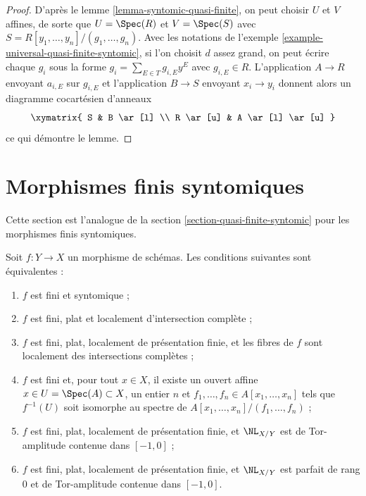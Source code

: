 \begin{proof}
D'après le lemme \ref{lemma-syntomic-quasi-finite},
on peut choisir $U$ et $V$ affines, de sorte que
$U = \Spec(R)$ et $V = \Spec(S)$ avec
$S = R[y_1, \ldots, y_n]/(g_1, \ldots, g_n)$.
Avec les notations de l'exemple \ref{example-universal-quasi-finite-syntomic},
si l'on choisit $d$ assez grand, on peut écrire chaque $g_i$ sous la forme
$g_i = \sum_{E \in T} g_{i, E}y^E$ avec $g_{i, E} \in R$.
L'application $A \to R$ envoyant $a_{i, E}$ sur $g_{i, E}$
et l'application $B \to S$ envoyant $x_i \to y_i$ donnent alors un diagramme cocartésien
d'anneaux
$$
\xymatrix{
S & B \ar[l] \\
R \ar[u] & A \ar[l] \ar[u]
}
$$
ce qui démontre le lemme.
\end{proof}











\section{Morphismes finis syntomiques}
\label{section-finite-syntomic}

\noindent
Cette section est l'analogue de la section \ref{section-quasi-finite-syntomic}
pour les morphismes finis syntomiques.

\begin{lemma}
\label{lemma-syntomic-finite}
Soit $f : Y \to X$ un morphisme de schémas. Les conditions suivantes sont équivalentes :
\begin{enumerate}
\item $f$ est fini et syntomique ;
\item $f$ est fini, plat et localement d'intersection complète ;
\item $f$ est fini, plat, localement de présentation finie,
et les fibres de $f$ sont localement des intersections complètes ;
\item $f$ est fini et, pour tout $x \in X$, il existe un
ouvert affine $x \in U = \Spec(A) \subset X$, un entier $n$
et $f_1, \ldots, f_n \in A[x_1, \ldots, x_n]$ tels que
$f^{-1}(U)$ soit isomorphe au spectre de
$A[x_1, \ldots, x_n]/(f_1, \ldots, f_n)$ ;
\item $f$ est fini, plat, localement de présentation finie,
et $\NL_{X/Y}$ est de Tor-amplitude contenue dans $[-1, 0]$ ;
\item $f$ est fini, plat, localement de présentation finie, et
$\NL_{X/Y}$ est parfait de rang $0$ et de Tor-amplitude contenue dans $[-1, 0]$.
\end{enumerate}
\end{lemma}

